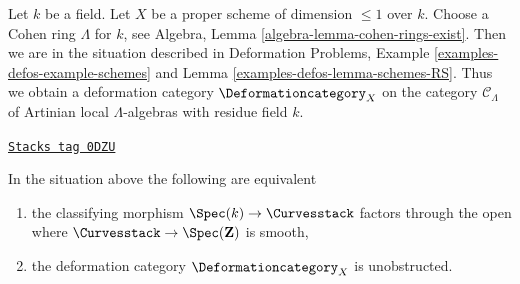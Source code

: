 \medskip\noindent
Let $k$ be a field. Let $X$ be a proper scheme of dimension $\leq 1$ over $k$.
Choose a Cohen ring $\Lambda$ for $k$, see
Algebra, Lemma \ref{algebra-lemma-cohen-rings-exist}.
Then we are in the situation described in
Deformation Problems, Example \ref{examples-defos-example-schemes} and
Lemma \ref{examples-defos-lemma-schemes-RS}.
Thus we obtain a deformation category $\Deformationcategory_X$
on the category $\mathcal{C}_\Lambda$ of Artinian local
$\Lambda$-algebras with residue field $k$.

\begin{lemma}
\label{moduli-curves-lemma-in-smooth-locus}
\href{https://stacks.math.columbia.edu/tag/0DZU}{\texttt{Stacks tag 0DZU}}

In the situation above the following are equivalent
\begin{enumerate}
\item the classifying morphism $\Spec(k) \to \Curvesstack$ factors
through the open where $\Curvesstack \to \Spec(\mathbf{Z})$ is smooth,
\item the deformation category $\Deformationcategory_X$ is unobstructed.
\end{enumerate}
\end{lemma}

